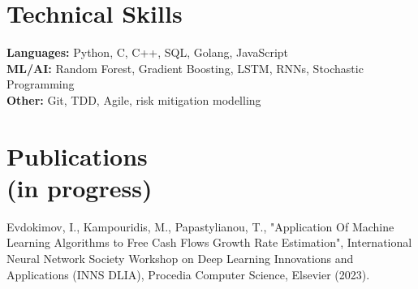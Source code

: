 \documentclass[a4paper,10pt]{article}
\begin{document}
\section*{Technical Skills}
\textbf{Languages:} Python, C, C++, SQL, Golang, JavaScript\\
\textbf{ML/AI:} Random Forest, Gradient Boosting, LSTM, RNNs, Stochastic Programming\\
\textbf{Other:} Git, TDD, Agile, risk mitigation modelling

\section*{Publications \\ \small (in progress)}
Evdokimov, I., Kampouridis, M., Papastylianou, T., "Application Of Machine Learning Algorithms to Free Cash Flows Growth Rate Estimation", International Neural Network Society Workshop on Deep Learning Innovations and Applications (INNS DLIA), Procedia Computer Science, Elsevier (2023).
\end{document}
